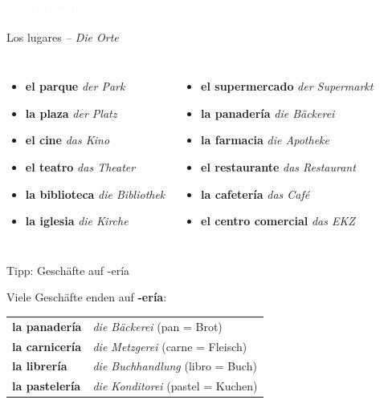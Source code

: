 \documentclass[aspectratio=169,11pt]{beamer}
\newcommand{\es}[1]{\textcolor{spanisch}{\textbf{#1}}}
\newcommand{\de}[1]{\textcolor{dunkelgrau}{\textit{#1}}}
\newcommand{\phase}[1]{\begin{center}\colorbox{spanisch}{\textcolor{white}{\large\bfseries #1}}\end{center}}
\begin{document}

\begin{frame}{}
\phase{Input: Los lugares}
\end{frame}

\begin{frame}{Los lugares \de{– Die Orte}}
\begin{columns}
\begin{itemize}
\item \es{el parque} \de{der Park}
\item \es{la plaza} \de{der Platz}
\item \es{el cine} \de{das Kino}
\item \es{el teatro} \de{das Theater}
\item \es{la biblioteca} \de{die Bibliothek}
\item \es{la iglesia} \de{die Kirche}
\end{itemize}

\begin{itemize}
\item \es{el supermercado} \de{der Supermarkt}
\item \es{la panadería} \de{die Bäckerei}
\item \es{la farmacia} \de{die Apotheke}
\item \es{el restaurante} \de{das Restaurant}
\item \es{la cafetería} \de{das Café}
\item \es{el centro comercial} \de{das EKZ}
\end{itemize}
\end{columns}
\end{frame}

\begin{frame}{Tipp: Geschäfte auf -ería}
\begin{center}
{\Large Viele Geschäfte enden auf \es{-ería}:}\\[1cm]
\begin{tabular}{ll}
\es{la panadería} & \de{die Bäckerei} (pan = Brot) \\[0.5em]
\es{la carnicería} & \de{die Metzgerei} (carne = Fleisch) \\[0.5em]
\es{la librería} & \de{die Buchhandlung} (libro = Buch) \\[0.5em]
\es{la pastelería} & \de{die Konditorei} (pastel = Kuchen) \\
\end{tabular}
\end{center}
\end{frame}
\end{document}
